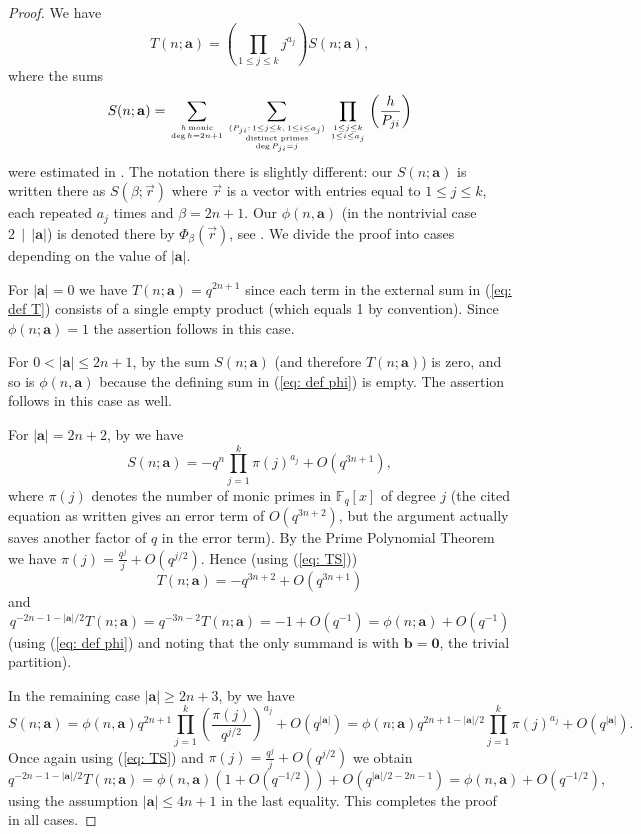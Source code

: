 \documentclass[alphabetic, 
        colorlinks,
        linkcolor=red,  citecolor=blue,
        backref
]{amsart}
\numberwithin{equation}{section}
\theoremstyle{definition}
\newcommand{\F}{\mathbb{F}}
\begin{document}
\begin{proof}

We have \begin{equation}\label{eq: TS}T(n;\mathbf a)=\left(\prod_{1\le j\le k}j^{a_j}\right)S(n;\mathbf a),\end{equation} where the sums
\begin{equation}\label{eq: def S}
S(n;\mathbf a)=\sum_{h\,\mathrm{monic}\atop{\deg h=2n+1}}\sum_{(P_{ji}:\,1\le j\le k,\,1\le i\le a_j)\atop{\text {distinct primes}\atop{\deg P_{ji}=j}}}\prod_{1\le j\le k\atop{1\le i\le a_j}}\left(\frac h{P_{ji}}\right)
\end{equation}
were estimated in \cite[\S 4]{ERR13}. The notation there is slightly different: our $S(n;\mathbf a)$ is written there as $S(\beta;\vec r)$ where $\vec r$ is a vector with entries equal to $1\le j\le k$, each repeated $a_j$ times and $\beta=2n+1$. Our $\phi(n,\mathbf a)$ (in the nontrivial case $2\,\mid\,|\mathbf a|$) is denoted there by $\Phi_\beta(\vec r)$, see \cite[Equation (3.8)]{ERR13}. We divide the proof into cases depending on the value of $|\mathbf a|$. 

For $|\mathbf a|=0$ we have $T(n;\mathbf a)=q^{2n+1}$ since each term in the external sum in (\ref{eq: def T}) consists of a single empty product (which equals 1 by convention). Since $\phi(n;\mathbf a)=1$ the assertion follows in this case.

For $0<|\mathbf a|\le 2n+1$, by \cite[Lemma 4.1]{ERR13} the sum $S(n;\mathbf a)$ (and therefore $T(n;\mathbf a)$) is zero, and so is $\phi(n,\mathbf a)$ because the defining sum in (\ref{eq: def phi}) is empty. The assertion follows in this case as well.

For $|\mathbf a|=2n+2$, by \cite[equation (4.5)]{ERR13}  we have 
$$
S(n;\mathbf a)=-q^{n}\prod_{j=1}^k\pi(j)^{a_j}+O\left( q^{3n+1}\right),
$$
where $\pi(j)$ denotes the number of monic primes in $\F_q[x]$ of degree $j$
(the cited equation as written gives an error term of $O\left(q^{3n+2}\right)$, but the argument actually saves another factor of $q$ in the error term). By the Prime Polynomial Theorem we have $\pi(j)=\frac{q^j}{j}+O(q^{j/2})$. Hence (using (\ref{eq: TS}))
$$
T(n;\mathbf a)=-q^{3n+2}+O\left(q^{3n+1}\right)$$
and $$q^{-2n-1-|\mathbf a|/2}T(n;\mathbf a)=q^{-3n-2}T(n;\mathbf a)=-1+O(q^{-1})=\phi(n;\mathbf a)+O(q^{-1})$$
(using (\ref{eq: def phi}) and noting that the only summand is with $\mathbf b=\mathbf 0$, the trivial partition).

In the remaining case $|\mathbf a|\ge 2n+3$, by  \cite[Proposition 4.3]{ERR13} we have
$$
S(n;\mathbf a)=\phi(n,\mathbf a)q^{2n+1}\prod_{j=1}^k{\left(\frac{\pi(j)}{q^{j/2}}\right)^{a_j}}+O\left(q^{|\mathbf a|}\right)=\phi(n;\mathbf a)q^{2n+1-|\mathbf a|/2}\prod_{j=1}^k\pi(j)^{a_j}+O\left(q^{|\mathbf a|}\right).
$$
Once again using (\ref{eq: TS}) and  $\pi(j)=\frac{q^j}{j}+O(q^{j/2})$ we obtain
$$
q^{-2n-1-|\mathbf a|/2}T(n;\mathbf a)=\phi(n,\mathbf a)\left(1+O(q^{-1/2})\right)+O\left(q^{|\mathbf a|/2-2n-1}\right)=\phi(n,\mathbf a)+O\left(q^{-1/2}\right),
$$
using the assumption $|\mathbf a|\le 4n+1$ in the last equality. This completes the proof in all cases.
\end{proof}
\end{document}
